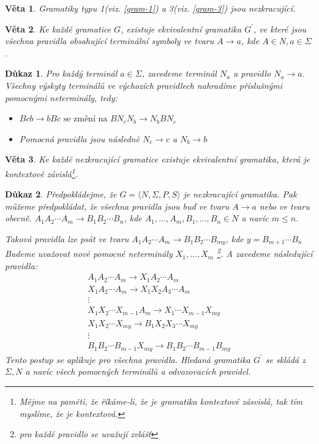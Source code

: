 \documentclass[10pt, a4paper, titlepage]{article}
\theoremstyle{note}
\newtheorem{veta}{Věta}
\newtheorem{dukaz}{Důkaz}
\begin{document}
\begin{veta}
Gramatiky typu 1(viz. \ref{gram-1}) a 3(viz. \ref{gram-3}) jsou nezkracující.
\end{veta}

\begin{veta}
Ke každé gramatice $G$, existuje ekvivalentní gramatika $G^{'}$, ve které
jsou všechna pravidla obsahující terminální symboly ve tvaru $A \rightarrow a$, kde $A \in N, a \in \Sigma$.
\end{veta}

\begin{dukaz}
Pro každý terminál $a \in \Sigma$, zavedeme terminál $N_{a}$ a pravidlo $N_{a} \rightarrow a$.
Všechny výskyty terminálů ve výchozích pravidlech nahradíme příslušnými pomocnými neterminály, tedy:
\begin{itemize}
\item
$Bcb \rightarrow bBc \text{ se změní na } BN_{c}N_{b} \rightarrow N_{b} BN_{c}$

\item
Pomocná pravidla jsou následně $N_{c} \rightarrow c$ a $N_{b} \rightarrow b$
\end{itemize}
\end{dukaz}

\begin{veta}
Ke každé nezkracující gramatice existuje ekvivalentní gramatika, která je kontextově závislá\footnote{Mějme na paměti, že říkáme-li, že je
gramatika kontextové zásvislá, tak tím myslíme, že je kontextová.}.
\end{veta}

\begin{dukaz}
Předpokládejme, že $G = \langle N, \Sigma, P, S \rangle$ je nezkracující gramatika. Pak můžeme předpokládat, 
že všechna pravidla jsou buď ve tvaru $A \rightarrow a$ nebo ve tvaru obecně. 
$A_{1} A_{2} \cdots A_{m} \rightarrow B_{1} B_{2} \cdots B_{n}$, kde $A_{1}, \ldots,A_{m}, B_{1}, \ldots,B_{n} \in N$ a navíc $m \leq n$. 

Taková pravidla lze psát ve tvaru $A_{1} A_{2} \cdots A_{m} \rightarrow B_{1} B_{2} \cdots B_{my}$, kde $y = B_{m+1} \cdots B_{n}$ 
Budeme uvažovat nové pomocné neterminály $X_{1},...,X_{m}$ \footnote{pro každé pravidlo se uvažují zvlášť}. 
A zavedeme následující pravidla:
\begin{gather*}
A_{1} A_{2} \cdots A_{m} \rightarrow X_{1} A_{2} \cdots A_{m} \\
X_{1} A_{2} \cdots A_{m} \rightarrow X_{1} X_{2} A_{3} \cdots A_{m} \\
\vdots \\
X_{1} X_{2} \cdots X_{m-1} A_{m} \rightarrow X_{1} \cdots X_{m-1} X_{my} \\
X_{1} X_{2} \cdots X_{my} \rightarrow B_{1} X_{2} X_{3} \cdots X_{my} \\
\vdots \\
B_{1} B_{2} \cdots B_{m-1} X_{my} \rightarrow B_{1} B_{2} \cdots B_{m-1}B_{my}
\end{gather*}
Tento postup se aplikuje pro všechna pravidla. Hledaná gramatika $G^{'}$ se skládá
z $\Sigma, N$ a navíc všech pomocných terminálů a odvozovacích pravidel.
\end{dukaz}
\end{document}
